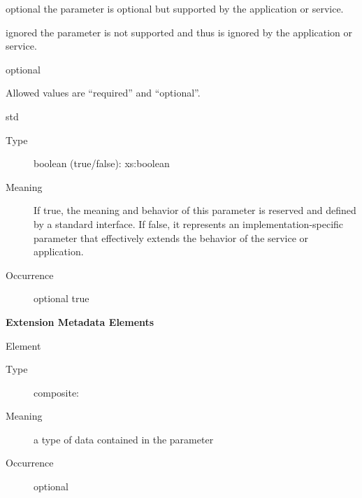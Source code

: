 \documentclass[11pt,a4paper]{ivoa}
\begin{document}
\begin{generated}
\begin{bigdescription}
\begin{description}
\begin{longtermsdescription}
\item[optional]
                  the parameter is optional but supported by the application or
                  service.
               
\item[ignored]
                  the parameter is not supported and thus is ignored by the 
                  application or service.
               
\end{longtermsdescription}
optional
\item[Comment] 
                     Allowed values are “required” and “optional”.
                  
\end{description}
\item[std]
\begin{description}
\item[Type] boolean (true/false): xs:boolean
\item[Meaning] 
                     If true, the meaning and behavior of this parameter is
                     reserved and defined by a standard interface.  If
                     false, it represents an implementation-specific
                     parameter that effectively extends the behavior of the 
                     service or application.  
                  
\item[Occurrence] optional
true
\end{description}


\end{bigdescription}\endgroup



\vspace{0.5ex}\noindent\textbf{ Extension Metadata Elements}

\begingroup\small\begin{bigdescription}\item[Element \xmlel{dataType}]
\begin{description}
\item[Type] composite: 
\item[Meaning] 
                        a type of data contained in the parameter
                     
\item[Occurrence] optional

\end{description}


\end{bigdescription}\endgroup

\endgroup
\end{generated}
\end{document}
